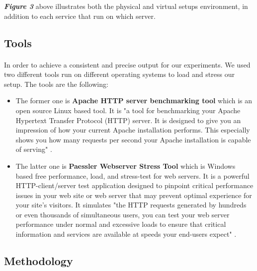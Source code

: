\textbf{\textit{Figure 3}} above illustrates both the physical and virtual setups environment, in addition to each service that run on which server.


\subsection{Tools}

\paragraph{}
In order to achieve a consistent and precise output for our experiments. We used two different tools run on different operating systems to load and stress our setup. The tools are the following: 

\begin{itemize}

\item The former one is \textbf{Apache HTTP server benchmarking tool} which is an open source Linux based tool. It is "a tool for benchmarking your Apache Hypertext Transfer Protocol (HTTP) server. It is designed to give you an impression of how your current Apache installation performs. This especially shows you how many requests per second your Apache installation is capable of serving" \cite{ab}. 

\item The latter one is \textbf{Paessler Webserver Stress Tool} which is Windows based free performance, load, and stress-test for web servers. It is a powerful HTTP-client/server test application designed to pinpoint critical performance issues in your web site or web server that may prevent optimal experience for your site's visitors. It  simulates "the HTTP requests generated by hundreds or even thousands of simultaneous users, you can test your web server performance under normal and excessive loads to ensure that critical information and services are available at speeds your end-users expect" \cite{paessler}.

\end{itemize}

\clearpage
\subsection{Methodology}
